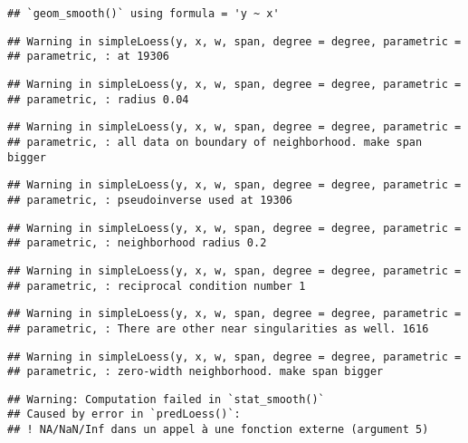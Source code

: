 \documentclass[
]{article}
\begin{document}
\begin{verbatim}
## `geom_smooth()` using formula = 'y ~ x'
\end{verbatim}

\begin{verbatim}
## Warning in simpleLoess(y, x, w, span, degree = degree, parametric =
## parametric, : at 19306
\end{verbatim}

\begin{verbatim}
## Warning in simpleLoess(y, x, w, span, degree = degree, parametric =
## parametric, : radius 0.04
\end{verbatim}

\begin{verbatim}
## Warning in simpleLoess(y, x, w, span, degree = degree, parametric =
## parametric, : all data on boundary of neighborhood. make span bigger
\end{verbatim}

\begin{verbatim}
## Warning in simpleLoess(y, x, w, span, degree = degree, parametric =
## parametric, : pseudoinverse used at 19306
\end{verbatim}

\begin{verbatim}
## Warning in simpleLoess(y, x, w, span, degree = degree, parametric =
## parametric, : neighborhood radius 0.2
\end{verbatim}

\begin{verbatim}
## Warning in simpleLoess(y, x, w, span, degree = degree, parametric =
## parametric, : reciprocal condition number 1
\end{verbatim}

\begin{verbatim}
## Warning in simpleLoess(y, x, w, span, degree = degree, parametric =
## parametric, : There are other near singularities as well. 1616
\end{verbatim}

\begin{verbatim}
## Warning in simpleLoess(y, x, w, span, degree = degree, parametric =
## parametric, : zero-width neighborhood. make span bigger
\end{verbatim}

\begin{verbatim}
## Warning: Computation failed in `stat_smooth()`
## Caused by error in `predLoess()`:
## ! NA/NaN/Inf dans un appel à une fonction externe (argument 5)
\end{verbatim}
\end{document}
